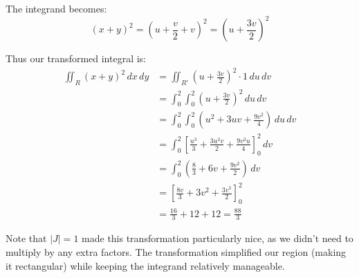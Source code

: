 \begin{example}
\begin{solution}
\noindent The integrand becomes:
\[
(x+y)^2 = (u + \frac{v}{2} + v)^2 = (u + \frac{3v}{2})^2
\]

\noindent Thus our transformed integral is:
\begin{align*}
\iint_R (x+y)^2\,dx\,dy &= \iint_{R'} (u + \frac{3v}{2})^2\cdot 1\,du\,dv \\
&= \int_0^2\int_0^2 (u + \frac{3v}{2})^2\,du\,dv \\
&= \int_0^2\int_0^2 (u^2 + 3uv + \frac{9v^2}{4})\,du\,dv \\
&= \int_0^2 \left[\frac{u^3}{3} + \frac{3u^2v}{2} + \frac{9v^2u}{4}\right]_0^2\,dv \\
&= \int_0^2 (\frac{8}{3} + 6v + \frac{9v^2}{2})\,dv \\
&= \left[\frac{8v}{3} + 3v^2 + \frac{3v^3}{2}\right]_0^2 \\
&= \frac{16}{3} + 12 + 12 = \frac{88}{3}
\end{align*}

\noindent Note that $|J| = 1$ made this transformation particularly nice, as we didn't need to multiply by any extra factors. The transformation simplified our region (making it rectangular) while keeping the integrand relatively manageable.
\end{solution}
\end{example}
\exampleline

